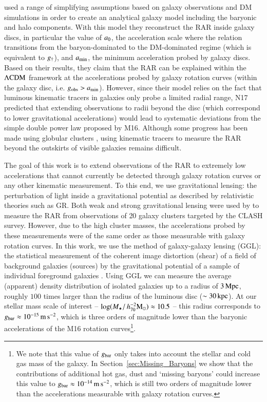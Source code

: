 \documentclass{aa}
\newcommand{\hmsun}{\,h_{70}^{-2} {\rm M_\odot}}
\newcommand{\mpss}{\,{\rm m}\,{\rm s}^{-2} }
\newcommand{\lcdm}{{\rm \Lambda CDM}}
\newcommand{\un}[1]{_{\rm #1}}
\begin{document}
\citet[][hereafter N17]{navarro2017} used a range of simplifying assumptions based on galaxy observations and DM simulations in order to create an analytical galaxy model including the baryonic and halo components. With this model they reconstruct the RAR inside galaxy discs, in particular the value of $a\un{0}$, the acceleration scale where the relation transitions from the baryon-dominated to the DM-dominated regime (which is equivalent to $g\un{\dagger}$), and $a\un{min}$, the minimum acceleration probed by galaxy discs. Based on their results, they claim that the RAR can be explained within the $\lcdm$ framework at the accelerations probed by galaxy rotation curves (within the galaxy disc, i.e. $g\un{obs}>a\un{min}$). However, since their model relies on the fact that luminous kinematic tracers in galaxies only probe a limited radial range, N17 predicted that extending observations to radii beyond the disc (which correspond to lower gravitational accelerations) would lead to systematic deviations from the simple double power law proposed by M16. Although some progress has been made using globular clusters \cite[]{bilek2019a, bilek2019b, muller2020}, using kinematic tracers to measure the RAR beyond the outskirts of visible galaxies remains difficult.

The goal of this work is to extend observations of the RAR to extremely low accelerations that cannot currently be detected through galaxy rotation curves or any other kinematic measurement. To this end, we use gravitational lensing: the perturbation of light inside a gravitational potential as described by relativistic theories such as GR. Both weak and strong gravitational lensing were used by \cite{tian2020} to measure the RAR from observations of 20 galaxy clusters targeted by the CLASH survey. However, due to the high cluster masses, the accelerations probed by these measurements were of the same order as those measurable with galaxy rotation curves. In this work, we use the method of galaxy-galaxy lensing (GGL): the statistical measurement of the coherent image distortion (shear) of a field of background galaxies (sources) by the gravitational potential of a sample of individual foreground galaxies \cite[lenses; for examples, see e.g.][]{brainerd1996,fischer2000,hoekstra2004,mandelbaum2006,uitert2016}. Using GGL we can measure the average (apparent) density distribution of isolated galaxies up to a radius of $3\,{\rm Mpc}$, roughly $100$ times larger than the radius of the luminous disc ($\sim 30\,{\rm kpc}$). At our stellar mass scale of interest -- $\log(M_\star/\hmsun) \approx 10.5$ -- this radius corresponds to $g\un{bar}\approx10^{-15} \mpss$, which is three orders of magnitude lower than the baryonic accelerations of the M16 rotation curves\footnote{We note that this value of $g\un{bar}$ only takes into account the stellar and cold gas mass of the galaxy. In Section~\ref{sec:Missing_Baryons} we show that the contributions of additional hot gas, dust and `missing baryons' could increase this value to $g\un{bar}\approx10^{-14}\mpss$, which is still two orders of magnitude lower than the accelerations measurable with galaxy rotation curves.}.
\end{document}
